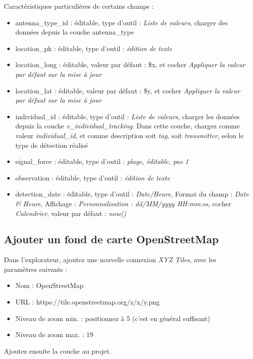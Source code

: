 Caractéristiques particulières de certains champs :
\begin{itemize}
	\item antenna\_type\_id : éditable, type d'outil : \textit{Liste de valeurs}, charger des données depuis la couche antenna\_type
	\item location\_pk : éditable, type d'outil : \textit{édition de texte}
	\item location\_long : éditable, valeur par défaut : \$x, et cocher \textit{Appliquer la valeur par défaut sur la mise à jour}
	\item location\_lat : éditable, valeur par défaut : \$y, et cocher \textit{Appliquer la valeur par défaut sur la mise à jour}
	\item individual\_id : éditable, type d'outil : \textit{Liste de valeurs}, charger les données depuis la couche \textit{v\_individual\_tracking}. Dans cette couche, chargez comme valeur \textit{individual\_id}, et comme description soit \textit{tag}, soit \textit{transmitter}, selon le type de détection réalisé
	\item signal\_force : éditable, type d'outil : \textit{plage, éditable, pas 1}
	\item observation : éditable, type d'outil : \textit{édition de texte}
	\item detection\_date : éditable, type d'outil : \textit{Date/Heure}, Format du champ : \textit{Date \& Heure}, Affichage : \textit{Personnalisation : dd/MM/yyyy HH:mm:ss}, cocher \textit{Calendrier}, valeur par défaut : \textit{now()}
\end{itemize}

\subsection{Ajouter un fond de carte OpenStreetMap}

Dans l'explorateur, ajoutez une nouvelle connexion \textit{XYZ Tiles}, avec les paramètres suivants :
\begin{itemize}
	\item Nom : OpenStreetMap
	\item URL : https://tile.openstreetmap.org/{z}/{x}/{y}.png
	\item Niveau de zoom min. : positionnez à 5 (c'est en général suffisant)
	\item Niveau de zoom max. : 19
\end{itemize}

Ajoutez ensuite la couche au projet.

